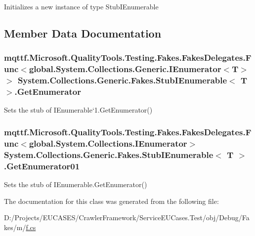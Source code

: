 Initializes a new instance of type Stub\-I\-Enumerable



\subsection{Member Data Documentation}
\hypertarget{class_system_1_1_collections_1_1_generic_1_1_fakes_1_1_stub_i_enumerable_3_01_t_01_4_acf015175553f49675be457b6f693bc71}{
\subsubsection[{Get\-Enumerator}]{\setlength{\rightskip}{0pt plus 5cm}mqttf.\-Microsoft.\-Quality\-Tools.\-Testing.\-Fakes.\-Fakes\-Delegates.\-Func$<$global.\-System.\-Collections.\-Generic.\-I\-Enumerator$<$T$>$ $>$ System.\-Collections.\-Generic.\-Fakes.\-Stub\-I\-Enumerable$<$ T $>$.Get\-Enumerator}}\label{class_system_1_1_collections_1_1_generic_1_1_fakes_1_1_stub_i_enumerable_3_01_t_01_4_acf015175553f49675be457b6f693bc71}


Sets the stub of I\-Enumerable`1.Get\-Enumerator()

\hypertarget{class_system_1_1_collections_1_1_generic_1_1_fakes_1_1_stub_i_enumerable_3_01_t_01_4_ad06743840d79823e47ca6ac84ac164e3}{
\subsubsection[{Get\-Enumerator01}]{\setlength{\rightskip}{0pt plus 5cm}mqttf.\-Microsoft.\-Quality\-Tools.\-Testing.\-Fakes.\-Fakes\-Delegates.\-Func$<$global.\-System.\-Collections.\-I\-Enumerator$>$ System.\-Collections.\-Generic.\-Fakes.\-Stub\-I\-Enumerable$<$ T $>$.Get\-Enumerator01}}\label{class_system_1_1_collections_1_1_generic_1_1_fakes_1_1_stub_i_enumerable_3_01_t_01_4_ad06743840d79823e47ca6ac84ac164e3}


Sets the stub of I\-Enumerable.\-Get\-Enumerator()



The documentation for this class was generated from the following file\-:\begin{DoxyCompactItemize}
\item 
D\-:/\-Projects/\-E\-U\-C\-A\-S\-E\-S/\-Crawler\-Framework/\-Service\-E\-U\-Cases.\-Test/obj/\-Debug/\-Fakes/m/\hyperlink{m_2f_8cs}{f.\-cs}\end{DoxyCompactItemize}

